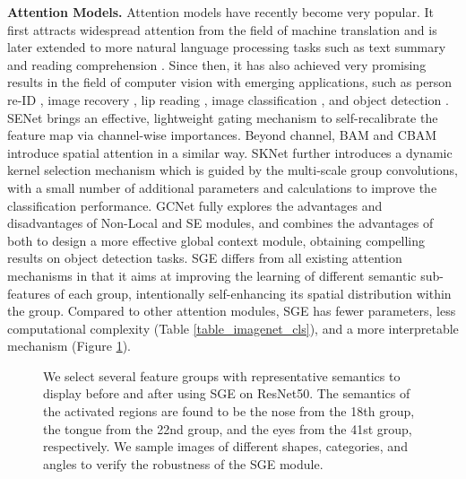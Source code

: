 \documentclass{article}
\begin{document}
	\textbf{Attention Models.} Attention models have recently become very popular. It first attracts widespread attention from the field of machine translation \cite{bahdanau2014neural,vaswani2017attention} and is later extended to more natural language processing tasks such as text summary \cite{rush2015neural} and reading comprehension \cite{seo2016bidirectional}. Since then, it has also achieved very promising results in the field of computer vision with emerging applications, such as person re-ID \cite{chen2018person}, image recovery \cite{zhang2018image}, lip reading \cite{xu2018lcanet}, image classification \cite{wang2017residual}, and object detection \cite{cao2019GCNet}. SENet \cite{hu2018squeeze} brings an effective, lightweight gating mechanism to self-recalibrate the feature map via channel-wise importances. Beyond channel, BAM \cite{park2018bam} and CBAM \cite{woo2018cbam} introduce spatial attention in a similar way. SKNet \cite{li2019selective} further introduces a dynamic kernel selection mechanism which is guided by the multi-scale group convolutions, with a small number of additional parameters and calculations to improve the classification performance. GCNet \cite{cao2019GCNet} fully explores the advantages and disadvantages of Non-Local \cite{wang2018non} and SE \cite{hu2018squeeze} modules, and combines the advantages of both to design a more effective global context module, obtaining compelling results on object detection tasks. SGE differs from all existing attention mechanisms in that it aims at improving the learning of different semantic sub-features of each group, intentionally self-enhancing its spatial distribution within the group. Compared to other attention modules, SGE has fewer parameters, less computational complexity (Table \ref{table_imagenet_cls}), and a more interpretable mechanism (Figure \ref{fig_vis}).
	
	\begin{figure}[t]
		\begin{center}
			\setlength{\fboxrule}{0pt}
		\end{center}	
		\vspace{-10pt}
		\caption{We select several feature groups with representative semantics to display before and after using SGE on ResNet50. The semantics of the activated regions are found to be the nose from the 18th group, the tongue from the 22nd group, and the eyes from the 41st group, respectively. We sample images of different shapes, categories, and angles to verify the robustness of the SGE module.}
		\label{fig_vis}
		\vspace{-10pt}
	\end{figure}
	
\end{document}
